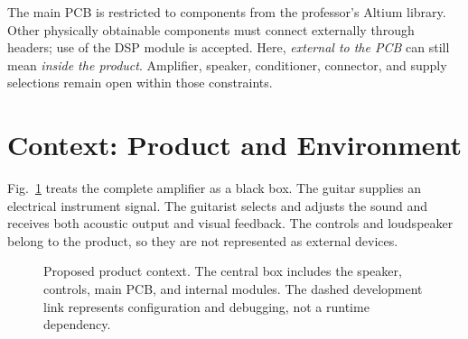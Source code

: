 \documentclass[conference]{IEEEtran}
\begin{document}
The main PCB is restricted to components from the professor's Altium
library. Other physically obtainable components must connect externally
through headers; use of the DSP module is accepted. Here, \emph{external
to the PCB} can still mean \emph{inside the product}. Amplifier, speaker,
conditioner, connector, and supply selections remain open within those
constraints.

\section{Context: Product and Environment}

Fig.~\ref{fig:context} treats the complete amplifier as a black box. The
guitar supplies an electrical instrument signal. The guitarist selects and
adjusts the sound and receives both acoustic output and visual feedback.
The controls and loudspeaker belong to the product, so they are not
represented as external devices.

\begin{figure}[t]
  \centering
  \caption{Proposed product context. The central box includes the speaker,
  controls, main PCB, and internal modules. The dashed development link
  represents configuration and debugging, not a runtime dependency.}
  \label{fig:context}
\end{figure}
\end{document}
